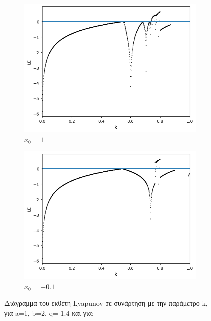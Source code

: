 \begin{figure}[h!]
\begin{subfigure}[b]{0.45\textwidth}
		\includegraphics[width=\textwidth]{LateX images/graphs q14/g8}
		\caption{\(x_0=1\)}
		\label{f:g25}
	\end{subfigure}
	\hfill
	\begin{subfigure}[b]{0.45\textwidth}
		\centering
		\includegraphics[width=\textwidth]{LateX images/graphs q14/g9}
		\caption{\(x_0=-0.1\)}
		\label{f:g26}
	\end{subfigure}
	\hfill
	\caption{ Διάγραμμα του εκθέτη Lyapunov σε συνάρτηση με την παράμετρο k, για a=1, b=2, q=-1.4 και για:}
	\label{f:g233}
\end{figure}


